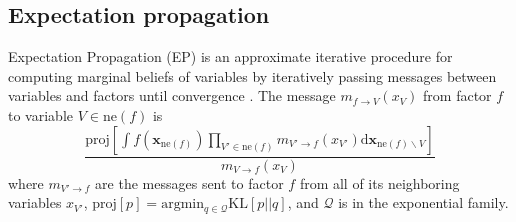 \documentclass[english]{article}
\theoremstyle{plain}
\theoremstyle{plain}
\newcommand{\bx}{\mathbf{x}}				%
\newcommand{\factor}{f}				%
\newcommand{\outV}{V}                         %
\newcommand{\fis}[1]{\mathrm{ne}(#1)}   	%
\newcommand{\fx}[1]{ \mathbf{x}_{\mathrm{ne}(#1)} }   	%
\newcommand{\msg}[2]{m_{#1 \rightarrow #2}}			%
\newcommand{\diffd}{\mathrm{d}}
\newcommand{\projP}[1]{\mathrm{proj} \left [ #1 \right]}
\newcommand{\argmin}[1]{\mathrm{arg}\mathrm{min}_{#1}}
\newcommand{\kld}[2]{\mathrm{KL} \left [ #1 || #2 \right ]}
\begin{document}

\subsection{Expectation propagation}
\label{sec:EP:MP}


Expectation Propagation (EP) is an approximate iterative procedure for
computing marginal beliefs of variables by iteratively passing messages between
variables and factors until convergence \citep{Minka2001}.  The message $\msg{
\factor }{\outV}(x_{\outV})$  from factor $\factor$ to variable
$\outV\in\fis{\factor}$ is 
%
\begin{equation}
\frac{ \projP{ 
\int \factor (\fx{\factor}) \prod_{\outV' \in \fis{\factor}} \msg{\outV'}{\factor}(x_{\outV'}) \diffd 
\bx_{\fis{\factor} \backslash \outV}} }
{\msg{\outV}{\factor}(x_{\outV})}
%
\label{eq:msgPassing:EP}
\end{equation}
%
where $\msg{\outV'}{\factor}$ are the messages sent to factor $\factor$ from all of its neighboring variables $x_{\outV'}$,
$\projP{p} = \argmin{q \in \mathcal{Q}} \kld{p}{q}$, and $\mathcal{Q}$ is in the exponential family.

\end{document}
